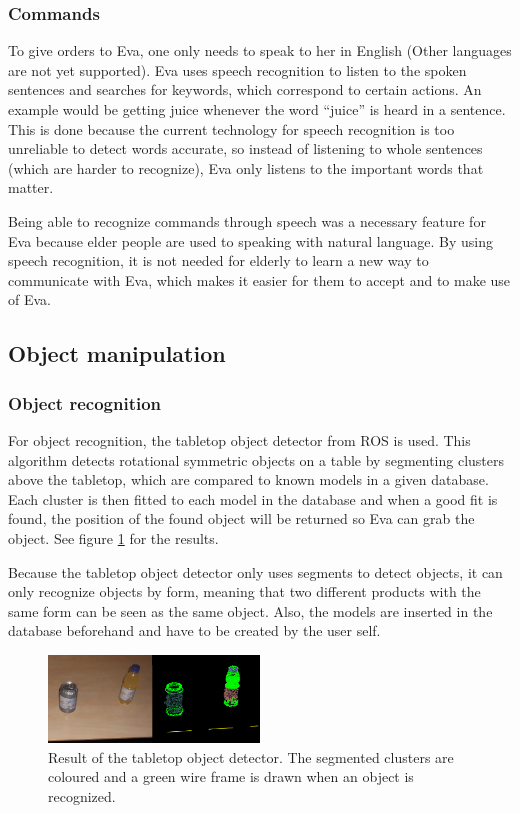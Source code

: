 \documentclass[project_eva.tex]{subfiles}
\begin{document}
\subsubsection*{Commands}
To give orders to Eva, one only needs to speak to her in English (Other languages are not yet supported). Eva uses speech 
recognition to listen to the spoken sentences and searches for keywords, which correspond to certain actions. An example 
would be getting juice whenever the word ``juice'' is heard in a sentence. This is done because the current technology for 
speech recognition is too unreliable to detect words accurate, so instead of listening to whole sentences (which are harder 
to recognize), Eva only listens to the important words that matter.

Being able to recognize commands through speech was a necessary feature for Eva because elder people are used to speaking 
with natural language. By using speech recognition, it is not needed for elderly to learn a new way to communicate with 
Eva, which makes it easier for them to accept and to make use of Eva.

\subsection*{Object manipulation}
\subsubsection*{Object recognition}
For object recognition, the tabletop object detector from ROS is used. This algorithm detects rotational symmetric objects on a table by segmenting clusters above the tabletop, which are compared to known models in a given database. Each cluster is then fitted to each model in the database and when a good fit is found, the position of the found object will be returned so Eva can grab the object. See figure \ref{fig:tabletop} for the results.

Because the tabletop object detector only uses segments to detect objects, it can only recognize objects by form, meaning that two different products with the same form can be seen as the same object. Also, the models are inserted in the database beforehand and have to be created by the user self.

\begin{figure}[h]
	\centering
	\mbox{\includegraphics[width=0.5\textwidth]{Images/object_detector.png}}
	\caption{Result of the tabletop object detector. The segmented clusters are coloured and a green wire frame is drawn when an object is recognized.}
	\label{fig:tabletop}
\end{figure}
\end{document}
